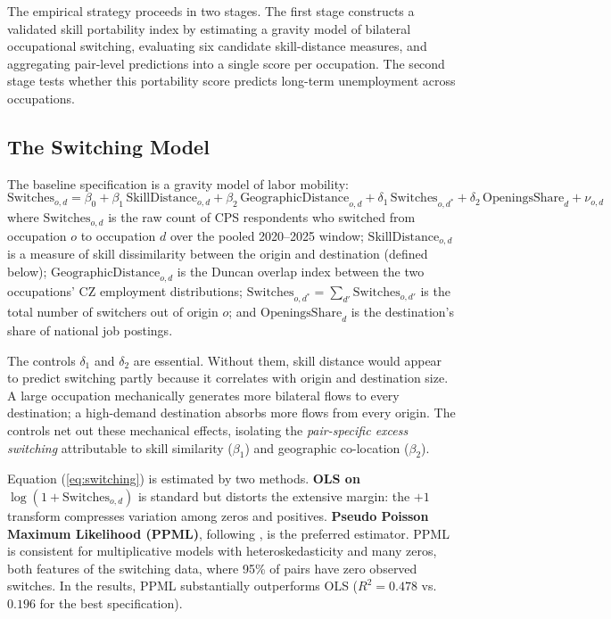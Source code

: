 \documentclass[12pt]{article}
\begin{document}
The empirical strategy proceeds in two stages. The first stage constructs a validated skill portability index by estimating a gravity model of bilateral occupational switching, evaluating six candidate skill-distance measures, and aggregating pair-level predictions into a single score per occupation. The second stage tests whether this portability score predicts long-term unemployment across occupations.

\subsection{The Switching Model}
\label{sec:strategy_model}

The baseline specification is a gravity model of labor mobility:
\begin{equation}
\label{eq:switching}
\text{Switches}_{o,d} = \beta_0 + \beta_1 \, \text{SkillDistance}_{o,d} + \beta_2 \, \text{GeographicDistance}_{o,d} + \delta_1 \, \text{Switches}_{o,d^*} + \delta_2 \, \text{OpeningsShare}_d + \nu_{o,d}
\end{equation}
where $\text{Switches}_{o,d}$ is the raw count of CPS respondents who switched from occupation $o$ to occupation $d$ over the pooled 2020--2025 window; $\text{SkillDistance}_{o,d}$ is a measure of skill dissimilarity between the origin and destination (defined below); $\text{GeographicDistance}_{o,d}$ is the Duncan overlap index between the two occupations' CZ employment distributions; $\text{Switches}_{o,d^*} = \sum_{d'} \text{Switches}_{o,d'}$ is the total number of switchers out of origin $o$; and $\text{OpeningsShare}_d$ is the destination's share of national job postings.

The controls $\delta_1$ and $\delta_2$ are essential. Without them, skill distance would appear to predict switching partly because it correlates with origin and destination size. A large occupation mechanically generates more bilateral flows to every destination; a high-demand destination absorbs more flows from every origin. The controls net out these mechanical effects, isolating the \emph{pair-specific excess switching} attributable to skill similarity ($\beta_1$) and geographic co-location ($\beta_2$).

Equation (\ref{eq:switching}) is estimated by two methods. \textbf{OLS on $\log(1 + \text{Switches}_{o,d})$} is standard but distorts the extensive margin: the $+1$ transform compresses variation among zeros and positives. \textbf{Pseudo Poisson Maximum Likelihood (PPML)}, following \citet{santos2006}, is the preferred estimator. PPML is consistent for multiplicative models with heteroskedasticity and many zeros, both features of the switching data, where 95\% of pairs have zero observed switches. In the results, PPML substantially outperforms OLS ($R^2 = 0.478$ vs.\ $0.196$ for the best specification).
\end{document}
